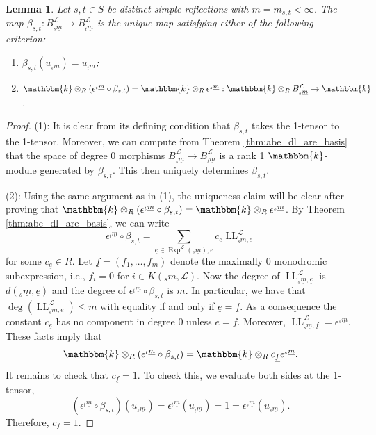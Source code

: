 \documentclass{amsart}
\renewcommand{\k}{\mathbbm{k}}
\newcommand{\scrL}{\mathcal{L}}
\DeclareMathOperator{\LL}{LL}
\DeclareMathOperator{\Exp}{Exp}
\newcommand{\ue}{\underline{e}}
\newcommand{\uf}{\underline{f}}
\newtheorem{lemma}[subsubsection]{Lemma}
\theoremstyle{definition}
\numberwithin{equation}{subsection}
\begin{document}
\begin{lemma}\label{lem:uniqueness_of_beta}
    Let $s,t \in S$ be distinct simple reflections with $m = m_{s,t} < \infty$. The map $\beta_{s,t} : B_{{}_s \underline{m}}^{\scrL} \to B_{{}_t \underline{m}}^{\scrL}$ is the unique map satisfying either of the following criterion:
    \begin{enumerate}
        \item $\beta_{s,t} (u_{{}_s \underline{m}}) = u_{{}_t \underline{m}}$;
        \item $\k \otimes_{R} (\epsilon^{{}_t \underline{m}} \circ \beta_{s,t}) = \k \otimes_{R} \epsilon^{{}_s \underline{m}} : \k \otimes_{R} B_{{}_s \underline{m}}^{\scrL} \to \k$.
    \end{enumerate}
\end{lemma}
\begin{proof}
    (1): It is clear from its defining condition that $\beta_{s,t}$ takes the 1-tensor to the 1-tensor. Moreover, we can compute from Theorem \ref{thm:abe_dl_are_basis} that the space of degree 0 morphisms $B_{{}_s \underline{m}}^{\scrL} \to B_{{}_t \underline{m}}^{\scrL}$ is a rank 1 $\k$-module generated by $\beta_{s,t}$.
    This then uniquely determines $\beta_{s,t}$.

    (2): Using the same argument as in (1), the uniqueness claim will be clear after proving that $\k \otimes_{R} (\epsilon^{{}_t \underline{m}} \circ \beta_{s,t}) = \k \otimes_{R} \epsilon^{{}_s \underline{m}}$.
    By Theorem \ref{thm:abe_dl_are_basis}, we can write
    \[\epsilon^{{}_t \underline{m}} \circ \beta_{s,t} = \sum_{\ue \in \Exp^{\scrL} ({}_s \underline{m}), e} c_{\ue} \LL_{{}_s \underline{m}, \ue}^{\scrL}\]
    for some $c_{\ue} \in R$. Let $\uf = (f_1, \ldots, f_m)$ denote the maximally 0 monodromic subexpression, i.e., $f_i = 0$ for $i \in K ({}_s \underline{m}, \scrL)$. 
    Now the degree of $\LL_{{}_s \underline{m}, \ue}^{\scrL}$ is $d ({}_s \underline{m}, \ue)$ and the degree of $\epsilon^{{}_t \underline{m}} \circ \beta_{s,t}$ is $m$.
    In particular, we have that $\deg \left( \LL_{{}_s \underline{m}, \ue}^{\scrL} \right) \leq m$ with equality if and only if $\ue = \uf$.
    As a consequence the constant $c_{\ue}$ has no component in degree $0$ unless $\ue = \uf$. Moreover, $\LL_{{}_s \underline{m}, \uf}^{\scrL} = \epsilon^{{}_s \underline{m}}$.
    These facts imply that 
    \[ \k \otimes_{R} (\epsilon^{{}_t \underline{m}} \circ \beta_{s,t}) = \k \otimes_{R} c_{\uf} \epsilon^{{}_s \underline{m}}.\]
    It remains to check that $c_{\uf} = 1$. To check this, we evaluate both sides at the 1-tensor,
    \[(\epsilon^{{}_t \underline{m}} \circ \beta_{s,t}) (u_{{}_s \underline{m}}) = \epsilon^{{}_t \underline{m}} (u_{{}_t \underline{m}}) = 1 =  \epsilon^{{}_s \underline{m}} (u_{{}_s \underline{m}}). \]
    Therefore, $c_{\uf} = 1$.
\end{proof}
\end{document}
